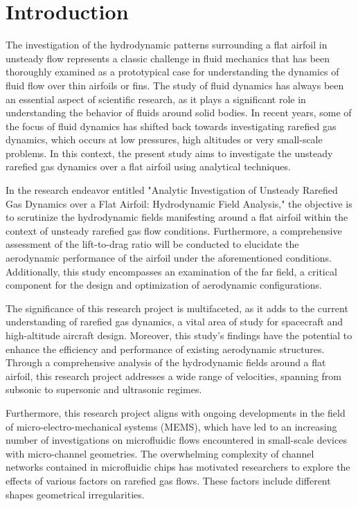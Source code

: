 \chapter{Introduction}
The investigation of the hydrodynamic patterns surrounding a flat airfoil in unsteady flow represents a classic challenge in fluid mechanics that has been thoroughly examined as a prototypical case for understanding the dynamics of fluid flow over thin airfoils or fins\cite{gombosi1994gaskinetic, abramov2020rarefied, liu2021aerodynamic}. The study of fluid dynamics has always been an essential aspect of scientific research, as it plays a significant role in understanding the behavior of fluids around solid bodies. In recent years, some of the focus of fluid dynamics has shifted back towards investigating rarefied gas dynamics\cite{sazhin2023rarefied,jha2023heat}, which occurs at low pressures, high altitudes or very small-scale problems. In this context, the present study aims to investigate the unsteady rarefied gas dynamics over a flat airfoil using analytical techniques.

In the research endeavor entitled "Analytic Investigation of Unsteady Rarefied Gas Dynamics over a Flat Airfoil: Hydrodynamic Field Analysis," the objective is to scrutinize the hydrodynamic fields manifesting around a flat airfoil within the context of unsteady rarefied gas flow conditions. Furthermore, a comprehensive assessment of the lift-to-drag ratio will be conducted to elucidate the aerodynamic performance of the airfoil under the aforementioned conditions. Additionally, this study encompasses an examination of the far field, a critical component for the design and optimization of aerodynamic configurations.

The significance of this research project is multifaceted, as it adds to the current understanding of rarefied gas dynamics, a vital area of study for spacecraft and high-altitude aircraft design. Moreover, this study's findings have the potential to enhance the efficiency and performance of existing aerodynamic structures. Through a comprehensive analysis of the hydrodynamic fields around a flat airfoil, this research project addresses a wide range of velocities, spanning from subsonic to supersonic and ultrasonic regimes.

Furthermore, this research project aligns with ongoing developments in the field of micro-electro-mechanical systems (MEMS), which have led to an increasing number of investigations\cite{kirby2010micro, berthier2010microfluidics, chakraborty2012microfluidics, karniadakis2006microflows} on microfluidic flows encountered in small-scale devices with micro-channel geometries. The overwhelming complexity of channel networks contained in microfluidic chips has motivated researchers to explore the effects of various factors on rarefied gas flows. These factors include different shapes geometrical irregularities.

